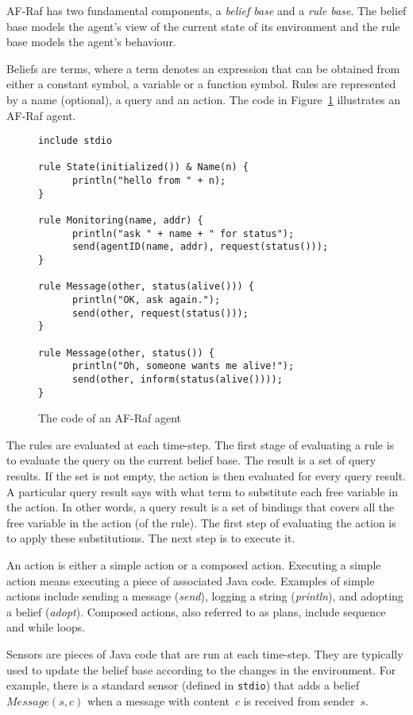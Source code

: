 \documentclass[a4paper,12pt,oneside,fleqn]{book} %
\newcommand{\rg}[1]{\marginpar{\tiny\raggedright\textcolor{blue}{\bf rg:} #1}}
\begin{document}
AF-Raf has two fundamental components, a \textit{belief base}
and a \textit{rule base}. The belief base models the agent's view of the
current state of its environment and the rule base models the agent's
behaviour.

Beliefs are terms, where a term denotes an expression that can be obtained from
either a constant symbol, a variable or a function symbol. Rules are
represented by a name (optional), a query and an action.  The code in
Figure~\ref{fig:AF-Raf} illustrates an AF-Raf agent.

\begin{figure}\footnotesize %
\begin{verbatim}
include stdio

rule State(initialized()) & Name(n) {
      println("hello from " + n);
}

rule Monitoring(name, addr) {
      println("ask " + name + " for status");
      send(agentID(name, addr), request(status()));
}

rule Message(other, status(alive())) {
      println("OK, ask again.");
      send(other, request(status()));
}

rule Message(other, status()) {
      println("Oh, someone wants me alive!");
      send(other, inform(status(alive())));
}
\end{verbatim}
\caption{The code of an AF-Raf agent}
\label{fig:AF-Raf}
\end{figure} %

The rules are evaluated at each time-step. The first stage of evaluating a
rule is to evaluate the query on the current belief base. The result is a
set of query results. \rg{A result is a set of results? Empty set is
special?} If the set is not empty, the action is then evaluated for every
query result. A particular query result says with what term to substitute
each free variable in the action. In other words, a query result is a set
of bindings that covers all the free variable in the action (of the rule).
The first step of evaluating the action is to apply these substitutions.
The next step is to execute it.

An action is either a simple action or a composed action. Executing a
simple action means executing a piece of associated Java code. Examples of
simple actions include sending a message (\textit{send}), logging a string
(\textit{println}), and adopting a belief (\textit{adopt}).  Composed
actions, also referred to as plans, include sequence and while loops.

Sensors are pieces of Java code that are run at each time-step. They are
typically used to update the belief base according to the changes in the
environment. For example, there is a standard sensor (defined in
\texttt{stdio}) that adds a belief $\mathit{Message}(s,c)$ when a message
with content~$c$ is received from sender~$s$. %
\end{document}
